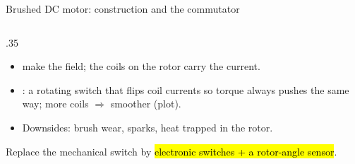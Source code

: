 \documentclass[aspectratio=169,10pt]{beamer}
\begin{document}
\begin{frame}{Brushed DC motor: construction and the commutator}
\begin{columns}[T]
\begin{column}{.35\textwidth}
\small
\begin{itemize}\setlength\itemsep{2pt}
\item {} make the field; the  coils on the rotor carry the current.
\item {}: a rotating switch that flips coil currents so torque always pushes the same way; more coils $\Rightarrow$ smoother (plot).
\item Downsides: brush wear, sparks, heat trapped in the rotor.
\end{itemize}
\begin{keybox}
Replace the mechanical switch by \hl{electronic switches + a rotor-angle sensor}.
\end{keybox}
\end{column}
\end{columns}
\end{frame}
\end{document}
